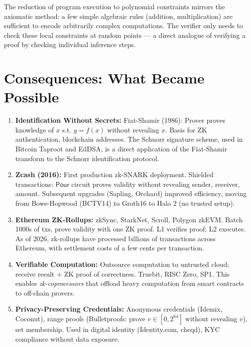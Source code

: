 The reduction of program execution to polynomial constraints mirrors the axiomatic method: a few simple algebraic rules (addition, multiplication) are sufficient to encode arbitrarily complex computations. The verifier only needs to check these local constraints at random points --- a direct analogue of verifying a proof by checking individual inference steps.

\section{Consequences: What Became Possible}
\label{sec:zk:consequences}

\begin{enumerate}
\item \textbf{Identification Without Secrets:} Fiat-Shamir (1986): Prover proves knowledge of $x$ s.t. $y = f(x)$ without revealing $x$. Basis for ZK authentication, blockchain addresses. The Schnorr signature scheme, used in Bitcoin Taproot and EdDSA, is a direct application of the Fiat-Shamir transform to the Schnorr identification protocol.

\item \textbf{Zcash (2016):} First production zk-SNARK deployment. Shielded transactions: $\mathsf{Pour}$ circuit proves validity without revealing sender, receiver, amount. Subsequent upgrades (Sapling, Orchard) improved efficiency, moving from Bowe-Hopwood (BCTV14) to Groth16 to Halo 2 (no trusted setup).

\item \textbf{Ethereum ZK-Rollups:} zkSync, StarkNet, Scroll, Polygon zkEVM. Batch 1000s of txs, prove validity with one ZK proof. L1 verifies proof; L2 executes. As of 2026, zk-rollups have processed billions of transactions across Ethereum, with settlement costs of a few cents per transaction.

\item \textbf{Verifiable Computation:} Outsource computation to untrusted cloud; receive result + ZK proof of correctness. Truebit, RISC Zero, SP1. This enables \emph{zk-coprocessors} that offload heavy computation from smart contracts to off-chain provers.

\item \textbf{Privacy-Preserving Credentials:} Anonymous credentials (Idemix, Coconut), range proofs (Bulletproofs: prove $v \in [0, 2^{64}]$ without revealing $v$), set membership. Used in digital identity (Identity.com, cheqd), KYC compliance without data exposure.


\end{enumerate}

